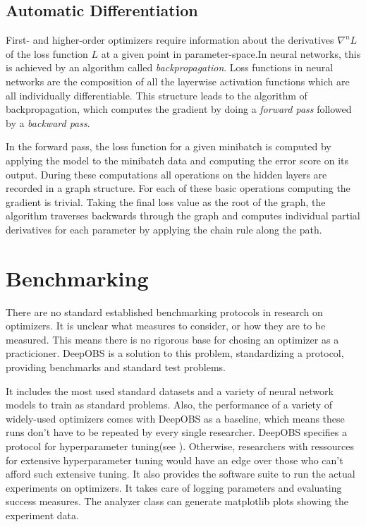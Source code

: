 \documentclass[twoside,12pt,a4paper]{report}
\begin{document}
\subsection{Automatic Differentiation}
First- and higher-order optimizers require information about the derivatives $\nabla ^n L$ of the loss function $L$ at a given point in parameter-space.In neural networks, this is achieved by an algorithm called \textit{backpropagation}.
Loss functions in neural networks are the composition of all the layerwise activation functions which are all individually differentiable. This structure leads to the algorithm of backpropagation, which computes the gradient by doing a \textit{forward pass} followed by a \textit{backward pass}.

In the forward pass, the loss function for a given minibatch is computed by applying the model to the minibatch data and computing the error score on its output. During these computations all operations on the hidden layers are recorded in a graph structure. For each of these basic operations computing the gradient is trivial. Taking the final loss value as the root of the graph, the algorithm traverses backwards through the graph and computes individual partial derivatives for each parameter by applying the chain rule along the path.


\section{Benchmarking}
There are no standard established benchmarking protocols in research on optimizers. It is unclear what measures to consider, or how they are to be measured. This means there is no rigorous base for chosing an optimizer as a practicioner.
DeepOBS is a solution to this problem, standardizing a protocol, providing benchmarks and standard test problems.

It includes the most used standard datasets and a variety of neural network models to train as standard problems. Also, the performance of a variety of widely-used optimizers comes with DeepOBS as a baseline, which means these runs don't have to be repeated by every single researcher.
DeepOBS specifies a protocol for hyperparameter tuning(see \cite{abahde}). Otherwise, researchers with ressources for extensive hyperparameter tuning would have an edge over those who can't afford such extensive tuning.
It also provides the software suite to run the actual experiments on optimizers. It takes care of logging parameters and evaluating success measures.
The analyzer class can generate matplotlib plots showing the experiment data.
\end{document}
